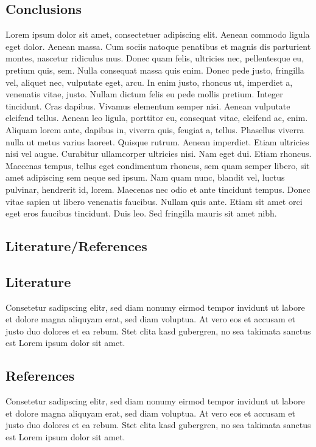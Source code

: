 \documentclass[a1paper]{article}
\begin{document}
\begin{posterbox}
	\vspace{-10mm}
	\raggedright

	\section*{Conclusions}
	Lorem ipsum dolor sit amet, consectetuer adipiscing elit. Aenean commodo ligula eget dolor. Aenean massa. Cum sociis natoque penatibus et magnis dis parturient montes, nascetur ridiculus mus. Donec quam felis, ultricies nec, pellentesque eu, pretium quis, sem. Nulla consequat massa quis enim. Donec pede justo, fringilla vel, aliquet nec, vulputate eget, arcu. In enim justo, rhoncus ut, imperdiet a, venenatis vitae, justo. Nullam dictum felis eu pede mollis pretium. Integer tincidunt. Cras dapibus. Vivamus elementum semper nisi. Aenean vulputate eleifend tellus. Aenean leo ligula, porttitor eu, consequat vitae, eleifend ac, enim. Aliquam lorem ante, dapibus in, viverra quis, feugiat a, tellus. Phasellus viverra nulla ut metus varius laoreet. Quisque rutrum. Aenean imperdiet. Etiam ultricies nisi vel augue. Curabitur ullamcorper ultricies nisi. Nam eget dui. Etiam rhoncus. Maecenas tempus, tellus eget condimentum rhoncus, sem quam semper libero, sit amet adipiscing sem neque sed ipsum. Nam quam nunc, blandit vel, luctus pulvinar, hendrerit id, lorem. Maecenas nec odio et ante tincidunt tempus. Donec vitae sapien ut libero venenatis faucibus. Nullam quis ante. Etiam sit amet orci eget eros faucibus tincidunt. Duis leo. Sed fringilla mauris sit amet nibh.
\end{posterbox}

\vfill

\begin{posterbox}
	\vspace{-10mm}
	\raggedright

	\section*{Literature/References}
	\subsection*{Literature}
	Consetetur sadipscing elitr, sed diam nonumy eirmod tempor invidunt ut labore et dolore magna aliquyam erat, sed diam voluptua. At vero eos et accusam et justo duo dolores et ea rebum. Stet clita kasd gubergren, no sea takimata sanctus est Lorem ipsum dolor sit amet.

	\subsection*{References}
	Consetetur sadipscing elitr, sed diam nonumy eirmod tempor invidunt ut labore et dolore magna aliquyam erat, sed diam voluptua. At vero eos et accusam et justo duo dolores et ea rebum. Stet clita kasd gubergren, no sea takimata sanctus est Lorem ipsum dolor sit amet.
\end{posterbox}
\end{document}
